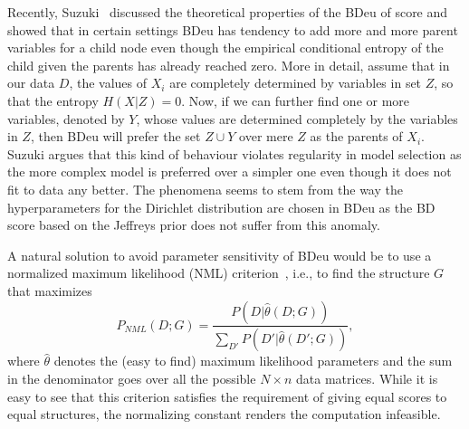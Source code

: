 Recently, Suzuki~\cite{Suzuki2017} discussed the theoretical
properties of the BDeu of score and showed that in certain settings
BDeu has tendency to add more and more parent variables for a child
node even though the empirical conditional entropy of the child given
the parents has already reached zero. More in detail, assume that in
our data $D$, the values of $X_i$ are completely determined by
variables in set $Z$, so that the entropy $H(X | Z) = 0$. Now, if we
can further find one or more variables, denoted by $Y$, whose values
are determined completely by the variables in $Z$, then BDeu will
prefer the set $Z\cup Y$ over mere $Z$ as the parents of $X_i$. Suzuki
argues that this kind of behaviour violates regularity in model
selection as the more complex model is preferred over a simpler one
even though it does not fit to data any better. The phenomena seems to
stem from the way the hyperparameters for the Dirichlet distribution
are chosen in BDeu as the BD score based on the Jeffreys prior does
not suffer from this anomaly.


A natural solution to avoid parameter sensitivity of BDeu would be to
use a normalized maximum likelihood (NML)
criterion~\cite{Shta87,Riss96a}, i.e., to find the structure $G$ that
maximizes
\begin{equation}
P_{NML}(D;G)=\frac{P(D|\hat\theta(D;G))}{\sum_{D'}{P(D'|\hat\theta(D';G))}},
\end{equation}
where $\hat\theta$ denotes the (easy to find) maximum likelihood
parameters and the sum in the denominator goes over all the possible
$N\times n$ data matrices. While it is easy to see that this criterion
satisfies the requirement of giving equal scores to equal structures,
the normalizing constant renders the computation
infeasible.

